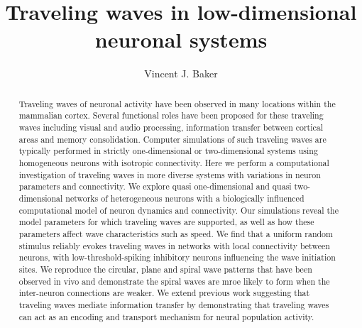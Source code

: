 \documentclass[subfig,blackref,approvalform]{drexel-thesis}
\author{Vincent J. Baker}
\title{Traveling waves in low-dimensional neuronal systems}
\begin{document}
\begin{DUTpreamble} %

\begin{dedications}

\end{dedications}

\begin{acknowledgments}

\end{acknowledgments}

\tableofcontents
\listoftables
\listoffigures

\begin{abstract}
Traveling waves of neuronal activity have been observed in many locations within the mammalian cortex.
Several functional roles have been proposed for these traveling waves including visual and audio processing, information transfer between cortical areas and memory consolidation.
Computer simulations of such traveling waves are typically performed in strictly one-dimensional or two-dimensional systems using homogeneous neurons with isotropic connectivity. 
Here we perform a computational investigation of traveling waves in more diverse systems with variations in neuron parameters and connectivity.
We explore quasi one-dimensional and quasi two-dimensional networks of heterogeneous neurons with a biologically influenced computational model of neuron dynamics and connectivity.
Our simulations reveal the model parameters for which traveling waves are supported, as well as how these parameters affect wave characteristics such as speed.
We find that a uniform random stimulus reliably evokes traveling waves in networks with local connectivity between neurons, with low-threshold-spiking inhibitory neurons influencing the wave initiation sites.
We reproduce the circular, plane and spiral wave patterns that have been observed in vivo and demonstrate the spiral waves are mroe likely to form when the inter-neuron connections are weaker.
We extend previous work suggesting that traveling waves mediate information transfer by demonstrating that traveling waves can act as an encoding and transport mechanism for neural population activity.

\end{abstract}
\end{DUTpreamble}

\begin{thesis}







\end{thesis}



%

\begin{vita}

\end{vita}
\end{document}
